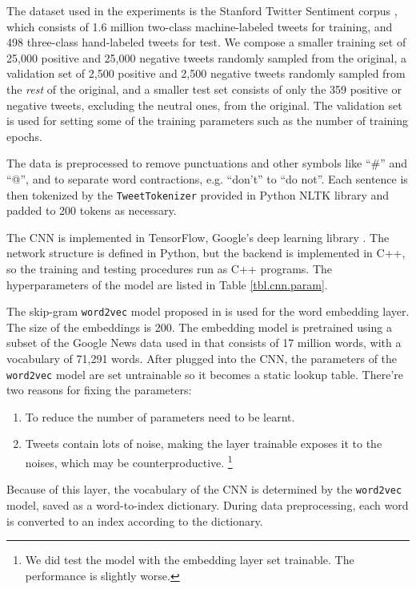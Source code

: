 The dataset used in the experiments is the Stanford Twitter Sentiment corpus \cite{go2009}, which consists of 1.6 million two-class machine-labeled tweets for training, and 498 three-class hand-labeled tweets for test. We compose a smaller training set of 25,000 positive and 25,000 negative tweets randomly sampled from the original, a validation set of 2,500 positive and 2,500 negative tweets randomly sampled from the {\em rest} of the original, and a smaller test set consists of only the 359 positive or negative tweets, excluding the neutral ones, from the original. The validation set is used for setting some of the training parameters such as the number of training epochs. 

The data is preprocessed to remove punctuations and other symbols like ``\#'' and ``@'', and to separate word contractions, e.g. ``don't'' to ``do not''. Each sentence is then tokenized by the {\tt TweetTokenizer} provided in Python NLTK \cite{bird2006} library and padded to 200 tokens as necessary. 

The CNN is implemented in TensorFlow, Google's deep learning library \cite{abadi2016}. The network structure is defined in Python, but the backend is implemented in C++, so the training and testing procedures run as C++ programs. The hyperparameters of the model are listed in Table \ref{tbl.cnn.param}. 

The skip-gram {\tt word2vec} model proposed in \cite{mikolov2013} is used for the word embedding layer. The size of the embeddings is 200. The embedding model is pretrained using a subset of the Google News data used in \cite{mikolov2013} that consists of 17 million words, with a vocabulary of 71,291 words. After plugged into the CNN, the parameters of the {\tt word2vec} model are set untrainable so it becomes a static lookup table. There're two reasons for fixing the parameters:
\begin{enumerate}
\item To reduce the number of parameters need to be learnt.
\item Tweets contain lots of noise, making the layer trainable exposes it to the noises, which may be counterproductive. \footnote{We did test the model with the embedding layer set trainable. The performance is slightly worse.}
\end{enumerate}
Because of this layer, the vocabulary of the CNN is determined by the {\tt word2vec} model, saved as a word-to-index dictionary. During data preprocessing, each word is converted to an index according to the dictionary. 


